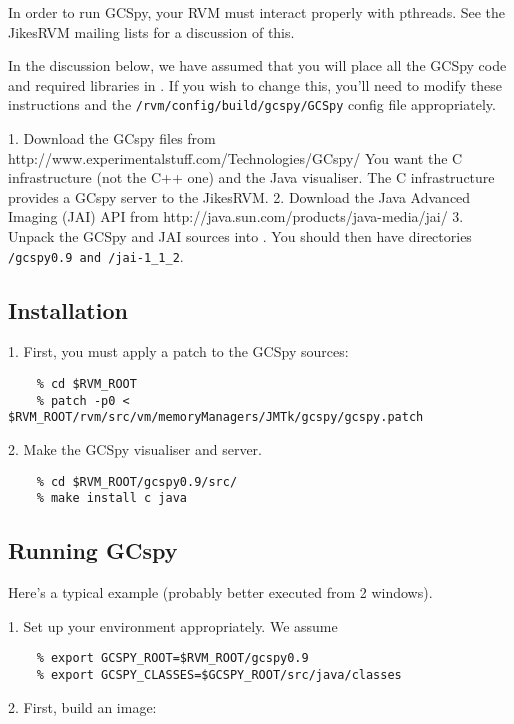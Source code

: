 In order to run GCSpy, your RVM must interact properly with pthreads. See the JikesRVM mailing lists for a discussion of this.

In the discussion below, we have assumed that you will place all the GCSpy code and required libraries in \rvmRoot. If you wish to change this, you'll need to modify these instructions and the {\tt \rvmRoot/rvm/config/build/gcspy/GCSpy} config file appropriately.

   1. Download the GCspy files from http://www.experimentalstuff.com/Technologies/GCspy/
      You want the C infrastructure (not the C++ one) and the Java visualiser. The C infrastructure provides a GCspy server to the JikesRVM.
   2. Download the Java Advanced Imaging (JAI) API from http://java.sun.com/products/java-media/jai/
   3. Unpack the GCSpy and JAI sources into \rvmRoot. You should then have directories {\tt \rvmRoot/gcspy0.9 and \rvmRoot/jai-1\_1\_2}. 



\subsection{Installation}

   1. First, you must apply a patch to the GCSpy sources:
\begin{verbatim}
    % cd $RVM_ROOT
    % patch -p0 < $RVM_ROOT/rvm/src/vm/memoryManagers/JMTk/gcspy/gcspy.patch
\end{verbatim}
   2. Make the GCSpy visualiser and server.
\begin{verbatim}
    % cd $RVM_ROOT/gcspy0.9/src/
    % make install c java
\end{verbatim}



\subsection{Running GCspy}

Here's a typical example (probably better executed from 2 windows).

   1. Set up your environment appropriately. We assume
\begin{verbatim}
    % export GCSPY_ROOT=$RVM_ROOT/gcspy0.9
    % export GCSPY_CLASSES=$GCSPY_ROOT/src/java/classes
\end{verbatim}
   2. First, build an image:

